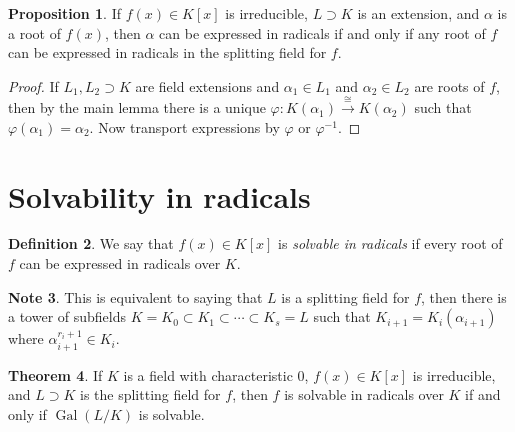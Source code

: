 \documentclass[10pt,letterpaper,cm]{nupset}
\theoremstyle{definition}
\newtheorem{definition}{Definition}[subsection]
\newtheorem{note}[definition]{Note}
\theoremstyle{theorem}
\newtheorem{theorem}[definition]{Theorem}
\newtheorem{prop}[definition]{Proposition}
\theoremstyle{remark}
\newcommand{\1}{\mathbf{1}}
\newcommand{\0}{\vec 0}
\DeclareMathOperator{\gal}{Gal}
\begin{document}
\begin{prop}
If $f(x) \in K[x]$ is irreducible, $L \supset K$ is an extension, and $\alpha$ is a root of $f(x)$, then $\alpha$ can be expressed in radicals if and only if any root of $f$ can be expressed in radicals in the splitting field for $f$.
\end{prop}
\begin{proof}
If $L_1, L_2 \supset K$ are field extensions and $\alpha_1 \in L_1$ and $\alpha_2 \in L_2$ are roots of $f$, then by the main lemma there is a unique $\varphi : K(\alpha_1) \overset{\cong}{\longrightarrow} K(\alpha_2)$ such that $\varphi(\alpha_1) = \alpha_2$. Now transport expressions by $\varphi$ or $\varphi^{-1}$.
\end{proof}

\section{Solvability in radicals}

\begin{definition}
We say that $f(x) \in K[x]$ is \textit{solvable in radicals} if every root of $f$ can be expressed in radicals over $K$.
\end{definition}

\begin{note}
This is equivalent to saying that $L$ is a splitting field for $f$, then there is a tower of subfields $K=K_0 \subset K_1 \subset \cdots \subset K_s =L$ such that $K_{i+1} = K_i(\alpha_{i+1})$ where $\alpha_{i+1}^{r_i+1} \in K_i$.
\end{note}

\begin{theorem}
If $K$ is a field with characteristic $0$, $f(x) \in K[x]$ is irreducible, and $L \supset K$ is the splitting field for $f$, then  $f$ is solvable in radicals over $K$ if and only if $\gal(L/K)$ is solvable. 
\end{theorem}
\end{document}

